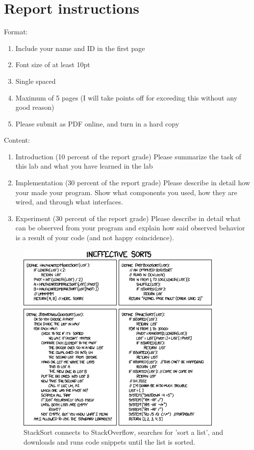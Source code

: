 \documentclass[letterpaper,12pt]{article}
\begin{document}
\section*{Report instructions}
Format:
\begin{enumerate}
   \item Include your name and ID in the first page
   \item Font size of at least 10pt
   \item Single spaced
   \item Maximum of 5 pages (I will take points off for exceeding this without any good reason)
   \item Please submit as PDF online, and turn in a hard copy
\end{enumerate}
Content:
\begin{enumerate}
   \item Introduction (10 percent of the report grade) Please summarize the task of this lab and what you have learned in the lab
   \item Implementation (30 percent of the report grade) Please describe in detail how your made your program. Show what components you used, how they are wired, and through what interfaces.
   \item Experiment (30 percent of the report grade) Please describe in detail what can be observed from your program and explain how said observed behavior is a result of your code (and not happy coincidence).
\end{enumerate}

\begin{figure}[ht!]
	\centering
	\includegraphics[width=4in]{ineffective_sorts.png}
    \caption*{StackSort connects to StackOverflow, searches for 'sort a list', and downloads and runs code snippets until the list is sorted.}
\end{figure}
\end{document}

